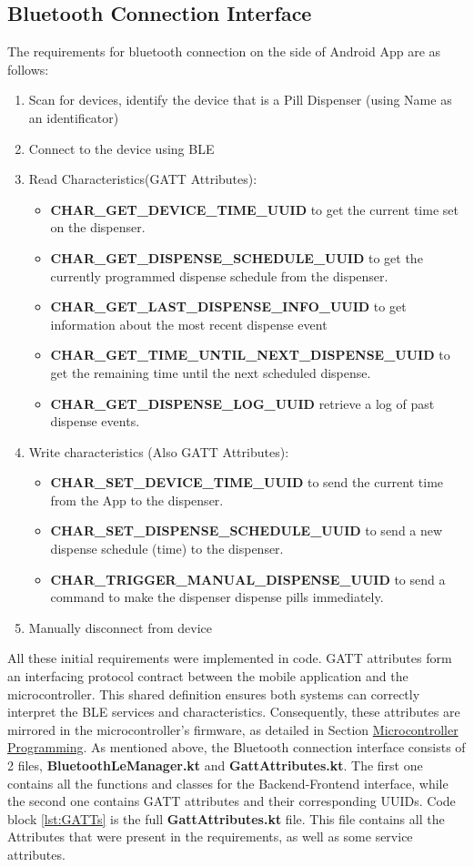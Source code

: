 \subsection{Bluetooth Connection Interface}\label{subsec:Bluetooth}
The requirements for bluetooth connection on the side of Android App are as follows:
\begin{enumerate}
	\item Scan for devices, identify the device that is a Pill Dispenser (using Name as an identificator)
	\item Connect to the device using \ac{BLE}
	\item Read Characteristics(\ac{GATT} Attributes): 
	\begin{itemize}
		\item \textbf{CHAR\_GET\_DEVICE\_TIME\_UUID} to get the current time set on the dispenser.
		\item \textbf{CHAR\_GET\_DISPENSE\_SCHEDULE\_UUID} to get the currently programmed dispense schedule from the dispenser.
		\item \textbf{CHAR\_GET\_LAST\_DISPENSE\_INFO\_UUID} to get information about the most recent dispense event
		\item \textbf{CHAR\_GET\_TIME\_UNTIL\_NEXT\_DISPENSE\_UUID} to get the remaining time until the next scheduled dispense.
		\item \textbf{CHAR\_GET\_DISPENSE\_LOG\_UUID} retrieve a log of past dispense events.
	\end{itemize}
	\item Write characteristics (Also \ac{GATT} Attributes):
	\begin{itemize}
		\item \textbf{CHAR\_SET\_DEVICE\_TIME\_UUID} to send the current time from the App to the dispenser.
		\item \textbf{CHAR\_SET\_DISPENSE\_SCHEDULE\_UUID} to send a new dispense schedule (time) to the dispenser.
		\item \textbf{CHAR\_TRIGGER\_MANUAL\_DISPENSE\_UUID} to send a command to make the dispenser dispense pills immediately.
	\end{itemize}
	\item Manually disconnect from device
\end{enumerate}
All these initial requirements were implemented in code. \ac{GATT} attributes form an interfacing protocol contract between the mobile application and the microcontroller. This shared definition ensures both systems can correctly interpret the \ac{BLE} services and characteristics. Consequently, these attributes are mirrored in the microcontroller's firmware, as detailed in Section  \hyperref[sec:Backenddev]{Microcontroller Programming}. As mentioned above, the Bluetooth connection interface consists of 2 files, \textbf{BluetoothLeManager.kt} and \textbf{GattAttributes.kt}. The first one contains all the functions and classes for the Backend-Frontend interface, while the second one contains \ac{GATT} attributes and their corresponding \ac{UUID}s. Code block \ref{lst:GATTs} is the full \textbf{GattAttributes.kt} file. This file contains all the Attributes that were present in the requirements, as well as some service attributes.

